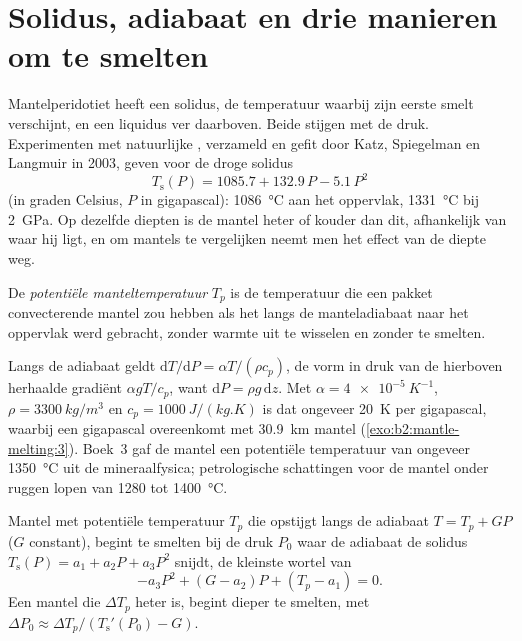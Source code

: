 \section{Solidus, adiabaat en drie manieren om te smelten}\label{sec:b2:mantle-melting:solidus}

Mantelperidotiet heeft een solidus, de temperatuur waarbij zijn eerste smelt verschijnt,
en een liquidus ver daarboven. Beide stijgen met de druk. Experimenten met natuurlijke
, verzameld en gefit door Katz, Spiegelman en Langmuir in 2003, geven
voor de droge solidus
\[
  T_{\mathrm{s}}(P) = 1085.7 + 132.9\,P - 5.1\,P^2
\]
(in graden Celsius, $P$ in gigapascal): \qty{1086}{\celsius} aan het oppervlak,
\qty{1331}{\celsius} bij \qty{2}{GPa}. Op dezelfde diepten is de mantel heter of
kouder dan dit, afhankelijk van waar hij ligt, en om mantels te vergelijken neemt men het
effect van de diepte weg.

\begin{definition}\label{def:b2:mantle-melting:tp}
De \emph{potentiële manteltemperatuur} $T_p$
is de temperatuur die een pakket convecterende mantel zou hebben als het langs de manteladiabaat
naar het oppervlak werd gebracht, zonder warmte uit te wisselen en
zonder te smelten.
\end{definition}

Langs de adiabaat geldt $\mathrm dT/\mathrm dP = \alpha T/(\rho c_p)$, de vorm in
druk van de hierboven herhaalde gradiënt $\alpha gT/c_p$, want $\mathrm dP = \rho
g\,\mathrm dz$. Met $\alpha = \qty{4e-5}{K^{-1}}$, $\rho = \qty{3300}{kg/m^3}$
en $c_p = \qty{1000}{J/(kg.K)}$ is dat ongeveer \qty{20}{K} per gigapascal, waarbij een
gigapascal overeenkomt met \qty{30.9}{km} mantel (\cref{exo:b2:mantle-melting:3}). Boek~3 gaf
de mantel een potentiële temperatuur van ongeveer \qty{1350}{\celsius} uit de
mineraalfysica; petrologische schattingen voor de mantel onder ruggen lopen van 1280 tot
\qty{1400}{\celsius}.

\begin{proposition}\label{prop:b2:mantle-melting:onset}
Mantel met potentiële temperatuur $T_p$ die opstijgt langs de adiabaat $T = T_p + GP$ ($G$
constant), begint te smelten bij de druk $P_0$ waar de adiabaat de
solidus $T_{\mathrm s}(P) = a_1 + a_2P + a_3P^2$ snijdt, de kleinste wortel van
\[
  -a_3P^2 + (G - a_2)P + (T_p - a_1) = 0 .
\]
Een mantel die $\Delta T_p$ heter is, begint dieper te smelten, met $\Delta P_0 \approx
\Delta T_p/(T_{\mathrm s}'(P_0) - G)$.
\end{proposition}

